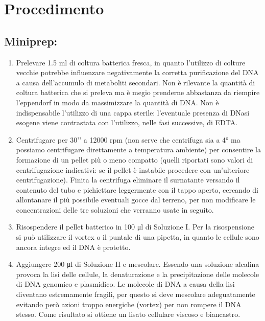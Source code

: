 \section{Procedimento}

\subsection{Miniprep: }

\begin{enumerate}
  \item Prelevare 1.5 ml di coltura batterica fresca, in quanto l’utilizzo di colture vecchie potrebbe
	influenzare negativamente la corretta purificazione del DNA a causa dell’accumulo di metaboliti secondari.
	Non è rilevante la quantità di coltura batterica che si preleva ma \`e megio prenderne abbastanza da riempire
	l’eppendorf in modo da massimizzare la quantità di DNA. Non è indispensabile l’utilizzo di una cappa sterile:
	l’eventuale presenza di DNasi esogene viene contrastata con l’utilizzo, nelle fasi successive, di EDTA.
  \item Centrifugare per 30’’ a 12000 rpm (non serve che centrifuga sia a 4° ma possiamo centrifugare direttamente
	a temperatura ambiente) per consentire la formazione di un pellet più o meno
	compatto (quelli riportati sono valori di centrifugazione indicativi: se il pellet è instabile procedere
	con un’ulteriore centrifugazione). Finita la centrifuga eliminare il surnatante versando il contenuto del tubo e
	pichiettare leggermente con il tappo aperto, cercando di allontanare il più possibile eventuali gocce dal terreno,
	per non modificare le concentrazioni delle tre soluzioni che verranno usate in seguito.

  \item Risospendere il pellet batterico in 100 μl di Soluzione I. Per la risospensione si può utilizzare il vortex o
	il puntale di una pipetta, in quanto le cellule sono ancora integre ed il DNA è protetto.

  \item Aggiungere 200 μl di Soluzione II e mescolare. Essendo una soluzione alcalina provoca la lisi delle cellule,
	la denaturazione e la  precipitazione delle molecole di DNA genomico e plasmidico.
	Le molecole di DNA a causa della lisi diventano estremamente fragili, per questo si deve mescolare
	adeguatamente evitando per\`o azioni troppo energiche (vortex) per non rompere il DNA stesso.
	Come risultato si ottiene un lisato cellulare viscoso e biancastro.


\end{enumerate}
